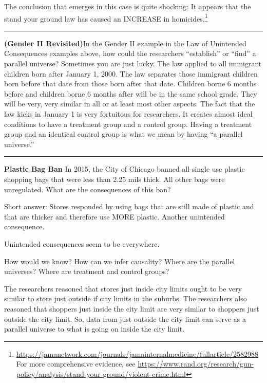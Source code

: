 \documentclass[
]{book}
\begin{document}
The conclusion that emerges in this case is quite shocking: It appears that the stand your ground law has caused an INCREASE in homicides.\footnote{\url{https://jamanetwork.com/journals/jamainternalmedicine/fullarticle/2582988}
  For more comprehensive evidence, see
  \url{https://www.rand.org/research/gun-policy/analysis/stand-your-ground/violent-crime.html}}

\begin{center}\rule{0.5\linewidth}{0.5pt}\end{center}

\textbf{(Gender II Revisited)}In the Gender II example in the Law of Unintended Consequences examples above, how could the researchers ``establish'' or ``find'' a parallel universe? Sometimes you are just lucky. The law applied to all immigrant children born after January 1, 2000. The law separates those immigrant children born before that date from those born after that date. Children borne 6 months before and children borne 6 months after will be in the same school grade. They will be very, very similar in all or at least most other aspects. The fact that the law kicks in January 1 is very fortuitous for researchers. It creates almost ideal conditions to have a treatment group and a control group. Having a treatment group and an identical control group is what we mean by having ``a parallel universe.''

\begin{center}\rule{0.5\linewidth}{0.5pt}\end{center}

\textbf{Plastic Bag Ban} In 2015, the City of Chicago banned all single use plastic shopping bags that were less than 2.25 mils thick. All other bags were unregulated. What are the consequences of this ban?

Short answer: Stores responded by using bags that are still made of plastic and that are thicker and therefore use MORE plastic. Another unintended consequence.

Unintended consequences seem to be everywhere.

How would we know? How can we infer causality? Where are the parallel universes? Where are treatment and control groups?

The researchers reasoned that stores just inside city limits ought to be very similar to store just outside if city limits in the suburbs. The researchers also reasoned that shoppers just inside the city limit are very similar to shoppers just outside the city limit. So, data from just outside the city limit can serve as a parallel universe to what is going on inside the city limit.
\end{document}
